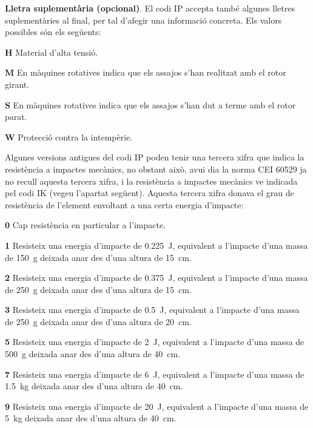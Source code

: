 \textbf{Lletra suplementària (opcional)}. El codi IP accepta també algunes
lletres suplementàries al final, per tal d'afegir una informació concreta. Els valors
possibles són els següents:
\begin{list}{}
   {\setlength{\labelwidth}{10mm} \setlength{\leftmargin}{10mm} \setlength{\labelsep}{2mm}}
   \item[\textbf{H}] Material d'alta tensió.
   \item[\textbf{M}] En màquines rotatives indica que els assajos s'han realitzat amb el
    rotor girant.
   \item[\textbf{S}] En màquines rotatives indica que els assajos s'han dut a terme amb el
    rotor parat.
   \item[\textbf{W}] Protecció contra la intempèrie.
\end{list}


Algunes versions antigues del codi IP poden tenir una tercera xifra que indica la resistència a impactes mecànics, no obstant això, avui  dia la norma CEI 60529 ja no recull aquesta tercera xifra, i la resistència a impactes mecànics ve indicada pel codi IK (vegeu l'apartat següent). Aquesta tercera xifra donava el grau de resistència de l'element envoltant a una certa energia d'impacte:
\begin{list}{}
   {\setlength{\labelwidth}{10mm} \setlength{\leftmargin}{10mm} \setlength{\labelsep}{2mm}}
   \item[\textbf{0}] Cap resistència en particular a l'impacte.
   \item[\textbf{1}] Resisteix una energia d'impacte de \qty{0,225}{J}, equivalent a l'impacte d'una massa de \qty{150}{g} deixada anar des d'una altura de \qty{15}{cm}.
   \item[\textbf{2}] Resisteix una energia d'impacte de \qty{0,375}{J}, equivalent a l'impacte d'una massa de \qty{250}{g} deixada anar des d'una altura de \qty{15}{cm}.
   \item[\textbf{3}] Resisteix una energia d'impacte de \qty{0,5}{J}, equivalent a l'impacte d'una massa de \qty{250}{g} deixada anar des d'una altura de \qty{20}{cm}.
   \item[\textbf{5}] Resisteix una energia d'impacte de \qty{2}{J}, equivalent a l'impacte d'una massa de \qty{500}{g} deixada anar des d'una altura de \qty{40}{cm}.
   \item[\textbf{7}] Resisteix una energia d'impacte de \qty{6}{J}, equivalent a l'impacte d'una massa de \qty{1,5}{kg} deixada anar des d'una altura de \qty{40}{cm}.
   \item[\textbf{9}]Resisteix una energia d'impacte de \qty{20}{J}, equivalent a l'impacte d'una massa de \qty{5}{kg} deixada anar des d'una altura de \qty{40}{cm}.
\end{list}

